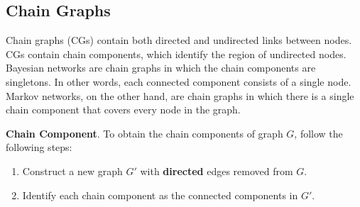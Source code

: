 \documentclass{article}
\begin{document}
\subsection{Chain Graphs}

Chain graphs (CGs) contain both directed and undirected links between nodes. CGs contain chain components, which identify the region of undirected nodes. Bayesian networks are chain graphs in which the chain components are singletons. In other words, each connected component consists of a single node. Markov networks, on the other hand, are chain graphs in which there is a single chain component that covers every node in the graph. 
\\
\begin{theorem}
    \textbf{Chain Component}. To obtain the chain components of graph $G$, follow the following steps:
    \begin{enumerate}
        \item Construct a new graph $G'$ with \textbf{directed} edges removed from $G$. 
        \item Identify each chain component as the connected components in $G'$.
    \end{enumerate}
\end{theorem}
\end{document}
